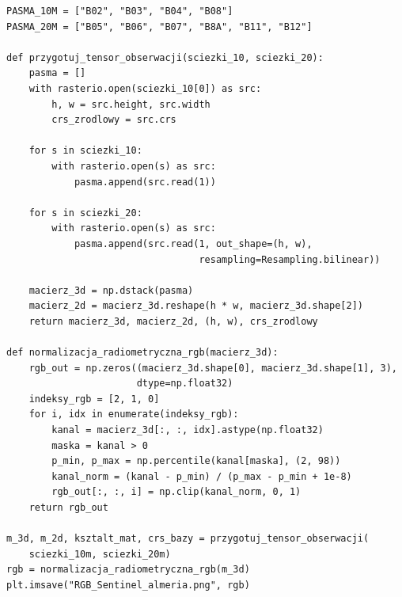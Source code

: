 \documentclass[12pt,a4paper]{article}
\begin{document}
\begin{lstlisting}[caption={Wczytanie pasm Sentinel-2 i przygotowanie obrazu RGB.},label={lst:data-rgb}]
PASMA_10M = ["B02", "B03", "B04", "B08"]
PASMA_20M = ["B05", "B06", "B07", "B8A", "B11", "B12"]

def przygotuj_tensor_obserwacji(sciezki_10, sciezki_20):
    pasma = []
    with rasterio.open(sciezki_10[0]) as src:
        h, w = src.height, src.width
        crs_zrodlowy = src.crs

    for s in sciezki_10:
        with rasterio.open(s) as src:
            pasma.append(src.read(1))

    for s in sciezki_20:
        with rasterio.open(s) as src:
            pasma.append(src.read(1, out_shape=(h, w),
                                  resampling=Resampling.bilinear))

    macierz_3d = np.dstack(pasma)
    macierz_2d = macierz_3d.reshape(h * w, macierz_3d.shape[2])
    return macierz_3d, macierz_2d, (h, w), crs_zrodlowy

def normalizacja_radiometryczna_rgb(macierz_3d):
    rgb_out = np.zeros((macierz_3d.shape[0], macierz_3d.shape[1], 3),
                       dtype=np.float32)
    indeksy_rgb = [2, 1, 0]
    for i, idx in enumerate(indeksy_rgb):
        kanal = macierz_3d[:, :, idx].astype(np.float32)
        maska = kanal > 0
        p_min, p_max = np.percentile(kanal[maska], (2, 98))
        kanal_norm = (kanal - p_min) / (p_max - p_min + 1e-8)
        rgb_out[:, :, i] = np.clip(kanal_norm, 0, 1)
    return rgb_out

m_3d, m_2d, ksztalt_mat, crs_bazy = przygotuj_tensor_obserwacji(
    sciezki_10m, sciezki_20m)
rgb = normalizacja_radiometryczna_rgb(m_3d)
plt.imsave("RGB_Sentinel_almeria.png", rgb)
\end{lstlisting}
\end{document}

